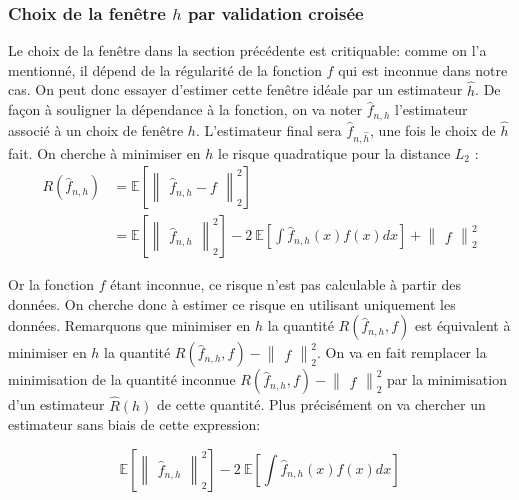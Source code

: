 \documentclass[
]{book}
\begin{document}
\hypertarget{choix-de-la-fenuxeatre-h-par-validation-croisuxe9e}{%
\subsubsection{\texorpdfstring{Choix de la fenêtre \(h\) par validation croisée}{Choix de la fenêtre h par validation croisée}}\label{choix-de-la-fenuxeatre-h-par-validation-croisuxe9e}}

Le choix de la fenêtre dans la section précédente est critiquable: comme on l'a mentionné, il dépend de la régularité de la fonction \(f\) qui est inconnue dans notre cas. On peut donc essayer d'estimer cette fenêtre idéale par un estimateur \(\hat{h}\). De façon à souligner la dépendance à la fonction, on va noter \(\hat{f}_{n,h}\) l'estimateur associé à un choix de fenêtre \(h\). L'estimateur final sera \(\hat{f}_{n,\hat{h}}\), une fois le choix de \(\hat{h}\) fait.\newline 
On cherche à minimiser en \(h\) le risque quadratique pour la distance \(L_2\) :
\[
\begin{aligned}
R(\hat {f}_{n,h})&=\mathbb{E}[\begin{Vmatrix}\hat {f}_{n,h}-f\end{Vmatrix}_2^2]\\        
&= \mathbb{E}[\begin{Vmatrix}\hat {f}_{n,h}\end{Vmatrix}_2^2] -2~\mathbb{E}[\int \hat {f}_{n,h}(x)f(x)dx] +\begin{Vmatrix}f\end{Vmatrix}_2^2
\end{aligned}
\]

Or la fonction \(f\) étant inconnue, ce risque n'est pas calculable à partir des données. On cherche donc à estimer ce risque en utilisant uniquement les données. Remarquons que minimiser en \(h\) la quantité \(R(\hat {f}_{n,h}, f)\) est équivalent à minimiser en \(h\) la quantité \(R(\hat {f}_{n,h}, f)-\begin{Vmatrix}f\end{Vmatrix}_2^2\). On va en fait remplacer la minimisation de la quantité inconnue \(R(\hat {f}_{n,h}, f)-\begin{Vmatrix}f\end{Vmatrix}_2^2\) par la minimisation d'un estimateur \(\hat {R}(h)\) de cette quantité. Plus précisément on va chercher un estimateur sans biais de cette expression:

\[
\mathbb{E}[\begin{Vmatrix}\hat {f}_{n,h}\end{Vmatrix}_2^2] -2~\mathbb{E}[\int \hat {f}_{n,h}(x)f(x)dx]
\]
\end{document}
